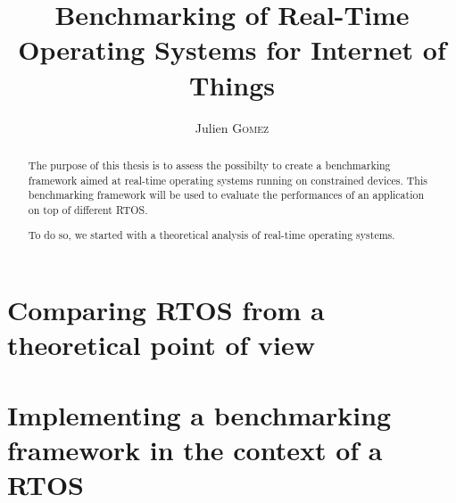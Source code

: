 \documentclass{EPL-master-thesis-covers-EN}
\title{Benchmarking of Real-Time Operating Systems for Internet of Things}
\author{Julien \textsc{Gomez}}
\begin{document}
  \maketitle

\cleardoublepage
{}

 \begin{abstract}

    The purpose of this thesis is to assess the possibilty to create a benchmarking framework aimed at 
      real-time operating systems running on constrained devices. 
    This benchmarking framework will be used to evaluate the performances of an application on top of different RTOS.

    To do so, we started with a theoretical analysis of real-time operating systems.
 \end{abstract}

{\hypersetup{hidelinks=true}
\tableofcontents
}

\cleardoublepage
{}



\part{Comparing RTOS from a theoretical point of view}




\part{Implementing a benchmarking framework in the context of a RTOS}










\cleardoublepage
{}
\listoffigures
\listoftables


\backcoverpage
\end{document}
